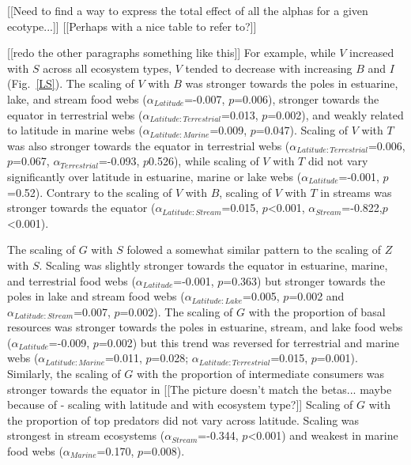 \documentclass[12pt]{article}
\begin{document}
[[Need to find a way to express the total effect of all the alphas for a given ecotype...]]
[[Perhaps with a nice table to refer to?]]

[[redo the other paragraphs something like this]]
For example, while $V$ increased with $S$ across all ecosystem types, $V$
tended to decrease with increasing $B$ and $I$ (Fig.~\ref{LS}). The scaling of
$V$ with $B$ was stronger towards the poles in estuarine, lake, and stream
food webs ($\alpha_{Latitude}$=-0.007, $p$=0.006), stronger towards the
equator in terrestrial webs ($\alpha_{Latitude:Terrestrial}$=0.013,
$p$=0.002), and weakly related to latitude in marine webs
($\alpha_{Latitude:Marine}$=0.009, $p$=0.047). Scaling of $V$ with $T$ was
also stronger towards the equator in terrestrial webs
($\alpha_{Latitude:Terrestrial}$=0.006, $p$=0.067,
$\alpha_{Terrestrial}$=-0.093, $p$0.526), while scaling of $V$ with $T$ did
not vary significantly over latitude in estuarine, marine or lake webs
($\alpha_{Latitude}$=-0.001, $p$=0.52). Contrary to the scaling of $V$ with
$B$, scaling of $V$ with $T$ in streams was stronger towards the equator
($\alpha_{Latitude:Stream}$=0.015, $p$\textless0.001,
$\alpha_{Stream}$=-0.822,$p$\textless0.001).



The scaling of $G$ with $S$ folowed a somewhat similar pattern to the scaling
of $Z$ with $S$.  Scaling was slightly stronger towards the equator in
estuarine, marine, and terrestrial food webs ($\alpha_{Latitude}$=-0.001,
$p$=0.363) but stronger towards the poles in lake and stream food webs
($\alpha_{Latitude:Lake}$=0.005, $p$=0.002 and
$\alpha_{Latitude:Stream}$=0.007, $p$=0.002).  The scaling of $G$ with the
proportion of basal resources was stronger towards the poles in estuarine,
stream, and lake food webs ($\alpha_{Latitude}$=-0.009, $p$=0.002) but this
trend was reversed for terrestrial and marine webs
($\alpha_{Latitude:Marine}$=0.011, $p$=0.028;
$\alpha_{Latitude:Terrestrial}$=0.015, $p$=0.001). Similarly, the scaling of
$G$ with the proportion of intermediate consumers was stronger towards the
equator in [[The picture doesn't match the betas... maybe because of - scaling
with latitude and with ecosystem type?]] Scaling of $G$ with the proportion of
top predators did not vary across latitude. Scaling was strongest in stream
ecosystems ($\alpha_{Stream}$=-0.344, $p$\textless0.001) and weakest in marine
food webs ($\alpha_{Marine}$=0.170, $p$=0.008).
\end{document}
